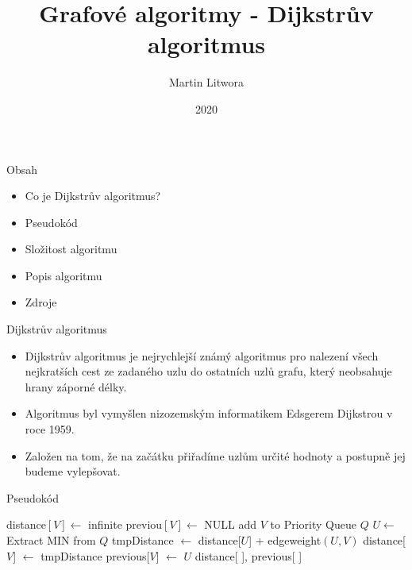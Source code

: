 \documentclass[czech]{beamer}
\title{Grafové algoritmy - Dijkstrův algoritmus}
\author{Martin Litwora}
\date{2020}
\begin{document}
\maketitle
\begin{frame}{Obsah}
\begin{itemize}
\item Co je Dijkstrův algoritmus? 
\item Pseudokód
\item Složitost algoritmu 
\item Popis algoritmu
\item Zdroje
\end{itemize}
\end{frame}

\begin{frame}{Dijkstrův algoritmus}
\begin{itemize}
    \item Dijkstrův algoritmus je nejrychlejší známý algoritmus pro nalezení všech nejkratších cest ze zadaného uzlu do ostatních uzlů grafu, \linebreak který neobsahuje hrany záporné délky.
    \item Algoritmus byl vymyšlen nizozemským informatikem Edsgerem Dijkstrou v roce 1959.
    \item Založen na tom, že na začátku přiřadíme uzlům určité hodnoty a postupně jej budeme vylepšovat.
\end{itemize}
\end{frame}

\begin{frame}{Pseudokód}
\begin{algorithm}[H]
\begin{algorithmic}[1]
\STATE distance$[V] \leftarrow $  infinite
\STATE previou$[V] \leftarrow $ NULL
\STATE add $V$ to Priority Queue $Q$
\ENDIF
\ENDFOR
{}
\STATE $U \leftarrow$ Extract MIN from $Q$
\STATE tmpDistance $\leftarrow$ distance[$U$] + edge\textunderscore weight$(U, V)$
\STATE distance[$V$] $\leftarrow$ tmpDistance
\STATE previous[$V$] $\leftarrow$ $U$
\ENDIF
\ENDFOR
\ENDWHILE
\RETURN distance[ ], previous[ ]
\end{algorithmic}
\end{algorithm}
\end{frame}
\end{document}
